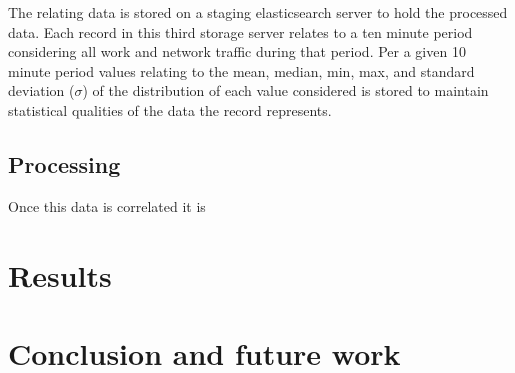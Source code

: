\documentclass[sigconf]{acmart}
\begin{document}
The relating data is stored on a staging elasticsearch server to hold the processed data. Each record in this third storage server relates to a ten minute period considering all work and network traffic during that period. Per a given 10 minute period values relating to the mean, median, min, max, and standard deviation ($\sigma$) of the distribution of each value considered is stored to maintain statistical qualities of the data the record represents.
\subsection{Processing}
Once this data is correlated it is
\section{Results}

\section{Conclusion and future work}
\end{document}
